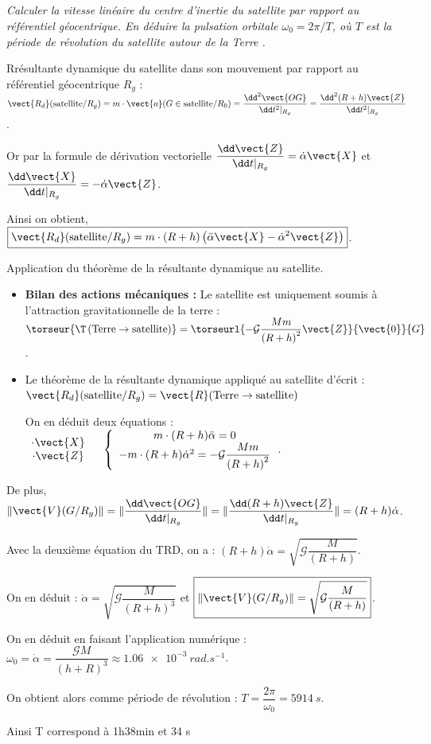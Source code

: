\subparagraph{\label{q_3}}\textit{Calculer la vitesse linéaire du centre d'inertie du satellite par
  rapport au référentiel géocentrique. En déduire la pulsation orbitale
$\omega_0=2\pi/T$, où $T$ est la période de révolution du satellite autour de la Terre .}
\ifprof
\begin{corrige}
Rrésultante dynamique du satellite dans son mouvement par rapport au référentiel géocentrique $R_g$ :
$\vect{R_d}(\text{satellite}/R_g)=m\cdot \vect{a}(G\in \text{satellite}/R_0)=\dfrac{\dd^2\vect{OG}}{\dd t^2\vert_{R_g}} =\dfrac{\dd^2(R+h)\vect{Z}}{\dd t^2\vert_{R_g}}$.

Or par la formule de dérivation vectorielle
$ \dfrac{\dd\vect{Z}}{\dd t\vert_{R_g}}=\dot{\alpha}\vect{X}$ 
et $\dfrac{\dd\vect{X}}{\dd t\vert_{R_g}}=-\dot{\alpha}\vect{Z}$.

Ainsi on obtient,
$
\boxed{
\vect{R_d}(\text{satellite}/R_g)=m\cdot (R+h)\left(\ddot{\alpha}\vect{X}-\dot{\alpha}^2\vect{Z}\right)
}$.

Application du théorème de la résultante dynamique au satellite.
\begin{itemize}
\item \textbf{Bilan des actions mécaniques :}
Le satellite est uniquement soumis à l'attraction gravitationnelle de la terre : 
$
\torseur{\T\left(\text{Terre}\to \text{satellite}\right)}=\torseurl{-\mathcal{G}\dfrac{Mm}{\left(R+h\right)^2}\vect{Z}}{\vect{0}}{G}$.
\item Le théorème de la résultante dynamique appliqué au satellite d'écrit : 
$\vect{R_d}(\text{satellite}/R_g)=\vect{R}(\text{Terre} \to \text{satellite})$

On en déduit deux équations : 
$
\begin{array}{c}
\cdot \vect{X}\\
\cdot \vect{Z}\\
\end{array}
\quad 
\left\{
\begin{array}{c}
m\cdot (R+h)\ddot{\alpha}=0\\
-m\cdot (R+h)\dot{\alpha}^2=-\mathcal{G}\dfrac{Mm}{\left(R+h\right)^2}\\
\end{array}
\right.
$.
\end{itemize}


De plus, $\Vert\vect{V}(G/R_g)\Vert=\Vert\dfrac{\dd\vect{OG}}{\dd t\vert_{R_g}}\Vert
=\Vert\dfrac{\dd (R+h)\vect{Z}}{\dd t\vert_{R_g}}\Vert=(R+h)\dot{\alpha}
$.

Avec la deuxième équation du TRD, on a : $(R+h)\dot{\alpha}=\sqrt{\mathcal{G}\dfrac{M}{\left(R+h\right)}}$.


On en déduit :  $ \boxed{\dot{\alpha}=\sqrt{\mathcal{G}\dfrac{M}{\left(R+h\right)^3}}}$
et 
$\boxed{ \Vert\vect{V}(G/R_g)\Vert=\sqrt{\mathcal{G}\dfrac{M}{\left(R+h\right)}}}$.


On en déduit en faisant l'application numérique : 
$\omega_0=\dot{\alpha}=\dfrac{\mathcal{G}M}{\left(h+R\right)^3}\approx\SI{1,06e-3}{rad.s^{-1}}$.


On obtient alors comme période de révolution :  $T=\dfrac{2\pi}{\omega_0}=\SI{5914}{s}$.

Ainsi T correspond à 1h38min et 34 s

\end{corrige}
